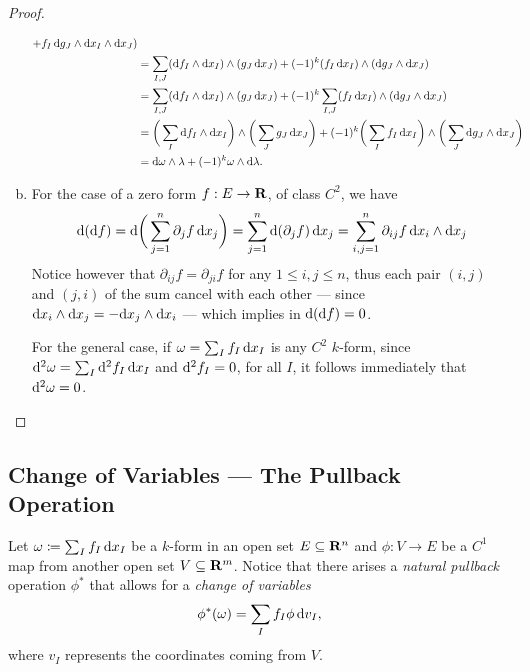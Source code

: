 \begin{proof}
\begin{enumerate}[(a)]
\begin{align*}
                  +  f_I\, \mathrm{d} g_J \wedge \mathrm{d} x_I \wedge \mathrm{d} x_J)                  \\
                   & = \sum_{I, J} (\mathrm{d} f_I \wedge \mathrm{d} x_I) \wedge (g_J\, \mathrm{d} x_J)
                  + (-1)^k (f_I\, \mathrm{d} x_I) \wedge (\mathrm{d} g_J \wedge \mathrm{d} x_J)         \\
                   & = \sum_{I, J} (\mathrm{d} f_I \wedge \mathrm{d} x_I) \wedge (g_J\, \mathrm{d} x_J)
                  + (-1)^k \sum_{I, J} (f_I\, \mathrm{d} x_I) \wedge (\mathrm{d} g_J \wedge \mathrm{d} x_J)
                  \\
                   & = \bigg( \sum_I \mathrm{d} f_I \wedge \mathrm{d} x_I\bigg) \wedge
                  \bigg( \sum_J g_J\, \mathrm{d} x_J \bigg)
                  + (-1)^k \bigg( \sum_I f_I\, \mathrm{d} x_I \bigg) \wedge
                  \bigg( \sum_J \mathrm{d} g_J \wedge \mathrm{d} x_J \bigg)                        \\
                   & = \mathrm{d} \omega \wedge \lambda + (-1)^k \omega \wedge \mathrm{d} \lambda.
              \end{align*}
        \item For the case of a zero form \(f: E \to \mathbf{R}\), of class \(C^2\), we have
              \[
                  \mathrm{d}(\mathrm{d} f) =
                  \mathrm{d} \bigg( \sum_{j=1}^n \partial_j f\, \mathrm{d} x_j \bigg)
                  = \sum_{j = 1}^n \mathrm{d} (\partial_j f)\, \mathrm{d} x_j
                  = \sum_{i, j = 1}^n \partial_{i j} f\, \mathrm{d} x_i \wedge \mathrm{d} x_j
              \]
              Notice however that \(\partial_{i j} f = \partial_{j i} f\) for any \(1 \leq
              i, j \leq n\), thus each pair \((i, j)\) and \((j, i)\) of the sum cancel with
              each other --- since \(\mathrm{d} x_i \wedge \mathrm{d} x_j = - \mathrm{d} x_j \wedge \mathrm{d}
              x_i\) --- which implies in \(\mathrm{d}(\mathrm{d} f) = 0\).

              For the general case, if \(\omega = \sum_I f_I\, \mathrm{d} x_I\) is any \(C^2\)
              \(k\)-form, since \(\mathrm{d}^2 \omega = \sum_I \mathrm{d}^2 f_I\, \mathrm{d} x_I\) and
              \(\mathrm{d}^2 f_I = 0\), for all \(I\), it follows immediately that \(\mathrm{d}^2
              \omega = 0\).
    \end{enumerate}
\end{proof}

\subsection{Change of Variables --- The Pullback Operation}

Let \(\omega \coloneq \sum_I f_I\, \mathrm{d} x_I\) be a \(k\)-form in an open set
\(E \subseteq \mathbf{R}^n\) and \(\phi: V \to E\) be a \(C^1\) map from another open
set \(V \subseteq \mathbf{R}^m\). Notice that there arises a \emph{natural pullback}
operation \(\phi^{*}\) that allows for a \emph{change of variables}
\begin{equation}
    \label{eq:change-of-variables-forms}
    \phi^{*}(\omega) = \sum_I f_I \phi\, \mathrm{d} v_I,
\end{equation}
where \(v_I\) represents the coordinates coming from \(V\).


